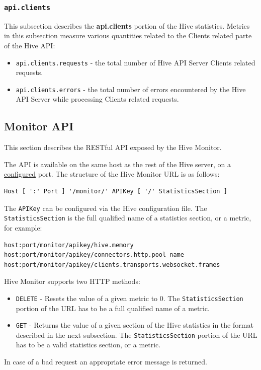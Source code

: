 \documentclass[a4paper]{article}
\begin{document}
\subsubsection{\texttt{api.clients}}
\label{sec-4-2-20}

This subsection describes the \textbf{api.clients} portion of the Hive statistics. Metrics in this subsection measure various quantities related to the Clients related parte of the Hive API:


\begin{itemize}
\item \texttt{api.clients.requests} - the total number of Hive API Server Clients related requests.
\item \texttt{api.clients.errors} - the total number of errors encountered by the Hive API Server while processing Clients related requests.
\end{itemize}
\subsection{Monitor API}
\label{sec-4-3}

This section describes the RESTful API exposed by the Hive Monitor.

\noindent
The API is available on the same host as the rest of the Hive server, on a \hyperref[sec-3-1-7]{configured} port. The structure of the Hive Monitor URL is as follows:


\begin{verbatim}
Host [ ':' Port ] '/monitor/' APIKey [ '/' StatisticsSection ]
\end{verbatim}




\noindent
The \texttt{APIKey} can be configured via the Hive configuration file. The \texttt{StatisticsSection} is the full qualified name of a statistics section, or a metric, for example:


\begin{verbatim}
host:port/monitor/apikey/hive.memory
host:port/monitor/apikey/connectors.http.pool_name
host:port/monitor/apikey/clients.transports.websocket.frames
\end{verbatim}



\noindent
Hive Monitor supports two HTTP methods:


\begin{itemize}
\item \texttt{DELETE} - Resets the value of a given metric to 0. The \texttt{StatisticsSection} portion of the URL has to be a full qualified name of a metric.
\item \texttt{GET} - Returns the value of a given section of the Hive statistics in the format described in the next subsection. The \texttt{StatisticsSection} portion of the URL has to be a valid statistics section, or a metric.
\end{itemize}
\noindent
In case of a bad request an appropriate error message is returned.
\end{document}
